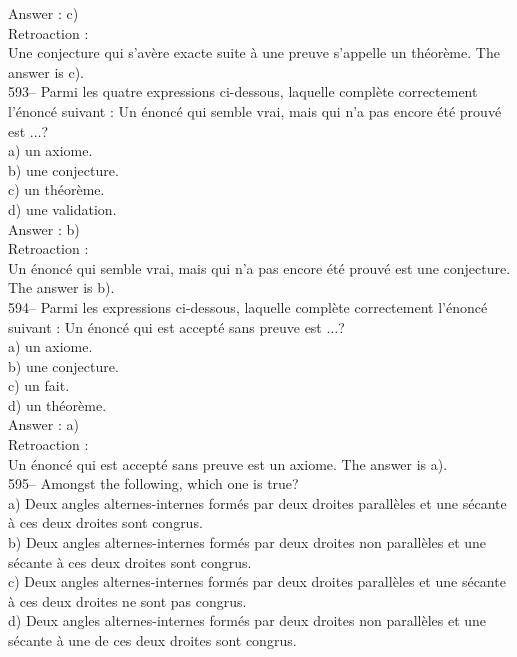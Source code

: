 ﻿\documentclass[letterpaper, 12pt]{article}
\begin{document}
Answer : c)\\

Retroaction : \\
Une conjecture qui s'av\`ere exacte suite \`a une preuve s'appelle un
th\'eor\`eme.  The answer is c).\\

593-- Parmi les quatre expressions ci-dessous, laquelle compl\`ete
correctement l'\'enonc\'e suivant : \og Un \'enonc\'e qui semble
vrai, mais qui n'a pas encore \'et\'e prouv\'e est $\ldots$\fg ?\\
a) un axiome.\\
b) une conjecture.\\
c) un th\'eor\`eme.\\
d) une validation.\\

Answer : b)\\

Retroaction : \\
Un \'enonc\'e qui semble vrai, mais qui n'a pas encore \'et\'e prouv\'e est
une conjecture.  The answer is b).\\

594-- Parmi les expressions ci-dessous, laquelle compl\`ete
correctement l'\'enonc\'e suivant : \og Un \'enonc\'e qui est
 accept\'e sans preuve est $\ldots$\fg ?\\
a) un axiome.\\
b) une conjecture.\\
c) un fait.\\
d) un th\'eor\`eme.\\

Answer : a)\\

Retroaction : \\
Un \'enonc\'e qui est accept\'e sans preuve est un
axiome.  The answer is a).  \\

595-- Amongst the following, which one is true?\\
a) Deux angles alternes-internes form\'es par deux droites parall\`eles et
une s\'ecante \`a ces deux droites sont congrus.\\
b) Deux angles alternes-internes form\'es par deux droites non parall\`eles
et une s\'ecante \`a ces deux droites sont congrus.\\
c) Deux angles alternes-internes form\'es par deux droites parall\`eles et
une s\'ecante \`a ces deux droites ne sont pas congrus.\\
d) Deux angles alternes-internes form\'es par deux droites non parall\`eles
et une s\'ecante \`a une de ces deux droites sont congrus.\\
\end{document}
